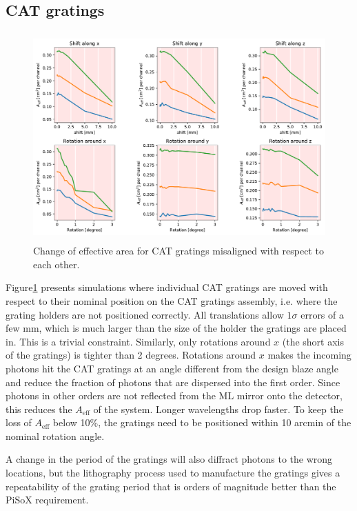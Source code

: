 \documentclass[]{spie}  %
\begin{document}
\subsection{CAT gratings}
\begin{figure} [ht]
  \begin{center}
    \includegraphics[height=8cm]{CAT_individual.pdf}
  \end{center}
  \caption
      { \label{fig:CAT_individual}Change of effective area for CAT gratings misaligned with respect to each other.
}
\end{figure}

Figure\ref{fig:CAT_individual} presents simulations where individual CAT gratings are moved with respect to their nominal position on the CAT gratings assembly, i.e. where the grating holders are not positioned correctly. All translations allow $1\sigma$ errors of a few mm, which is much larger than the size of the holder the gratings are placed in. This is a trivial constraint. Similarly, only rotations around $x$ (the short axis of the gratings) is tighter than 2 degrees. Rotations around $x$ makes the incoming photons hit the CAT gratings at an angle different from the design blaze angle and reduce the fraction of photons that are dispersed into the first order. Since photons in other orders are not reflected from the ML mirror onto the detector, this reduces the $A_{\mathrm{eff}}$ of the system. Longer wavelengths drop faster. To keep the loss of $A_{\mathrm{eff}}$ below 10\%, the gratings need to be positioned within 10 arcmin of the nominal rotation angle.

A change in the period of the gratings will also diffract photons to the wrong locations, but the lithography process used to manufacture the gratings gives a repeatability of the grating period that is orders of magnitude better than the PiSoX requirement.
\end{document}

